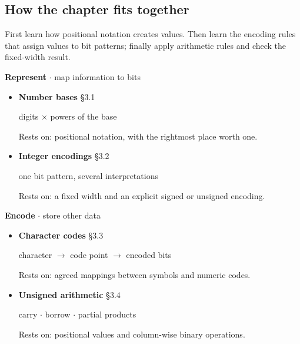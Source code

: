 \documentclass[11pt]{article}
\begin{document}
\begin{keepsection}
\section{How the chapter fits together}

First learn how positional notation creates values. Then learn the encoding rules that assign values to bit patterns; finally apply arithmetic rules and check the fixed-width result.

\textbf{Represent} \ensuremath{\cdot} map information to bits

\begin{itemize}
\item {}
\textbf{Number bases} \hfill{\small\color{FAUblue}§3.1}

digits \ensuremath{\times} powers of the base

Rests on: positional notation, with the rightmost place worth one.
\item {}
\textbf{Integer encodings} \hfill{\small\color{FAUblue}§3.2}

one bit pattern, several interpretations

Rests on: a fixed width and an explicit signed or unsigned encoding.
\end{itemize}

\textbf{Encode} \ensuremath{\cdot} store other data

\begin{itemize}
\item {}
\textbf{Character codes} \hfill{\small\color{FAUblue}§3.3}

character \ensuremath{\to} code point \ensuremath{\to} encoded bits

Rests on: agreed mappings between symbols and numeric codes.
\item {}
\textbf{Unsigned arithmetic} \hfill{\small\color{FAUblue}§3.4}

carry \ensuremath{\cdot} borrow \ensuremath{\cdot} partial products

Rests on: positional values and column-wise binary operations.
\end{itemize}


\end{keepsection}
\end{document}
